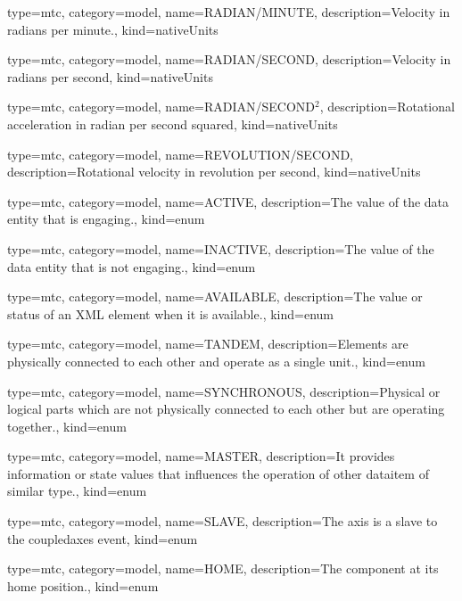 {
  type=mtc,
  category=model,
  name={RADIAN/MINUTE},
  description={Velocity in radians per minute.},
  kind={nativeUnits}
}


{
  type=mtc,
  category=model,
  name={RADIAN/SECOND},
  description={Velocity in radians per second},
  kind={nativeUnits}
}


{
  type=mtc,
  category=model,
  name={RADIAN/SECOND$^2$},
  description={Rotational acceleration in radian per second squared},
  kind={nativeUnits}
}


{
  type=mtc,
  category=model,
  name={REVOLUTION/SECOND},
  description={Rotational velocity in revolution per second},
  kind={nativeUnits}
}


{
  type=mtc,
  category=model,
  name={ACTIVE},
  description={The value of the \gls{data entity} that is engaging.},
  kind={enum}
}


{
  type=mtc,
  category=model,
  name={INACTIVE},
  description={The value of the \gls{data entity} that is not engaging.},
  kind={enum}
}


{
  type=mtc,
  category=model,
  name={AVAILABLE},
  description={The value or status of an XML element when it is available.},
  kind={enum}
}


{
  type=mtc,
  category=model,
  name={TANDEM},
  description={Elements are physically connected to each other and operate as a single unit.},
  kind={enum}
}


{
  type=mtc,
  category=model,
  name={SYNCHRONOUS},
  description={Physical or logical parts which are not physically connected to each other but are operating together.},
  kind={enum}
}


{
  type=mtc,
  category=model,
  name={MASTER},
  description={It provides information or state values that influences the operation of other \gls{dataitem} of similar type.},
  kind={enum}
}


{
  type=mtc,
  category=model,
  name={SLAVE},
  description={The axis is a slave to the \gls{coupledaxes event}},
  kind={enum}
}


{
  type=mtc,
  category=model,
  name={HOME},
  description={The component at its home position.},
  kind={enum}
}



